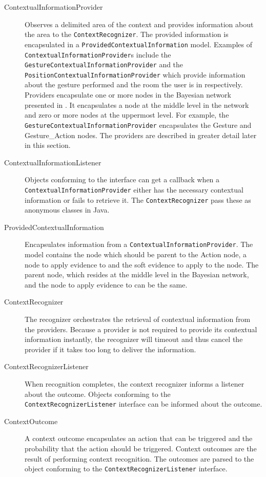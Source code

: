 \begin{description}
\item[ContextualInformationProvider] Observes a delimited area of the context and provides information about the area to the \texttt{ContextRecognizer}. The provided information is encapsulated in a \texttt{ProvidedContextualInformation} model. Examples of \texttt{ContextualInformationProvider}s include the \texttt{GestureContextualInformationProvider} and the \texttt{PositionContextualInformationProvider} which provide information about the gesture performed and the room the user is in respectively. Providers encapsulate one or more nodes in the Bayesian network presented in . It encapsulates a node at the middle level in the network and zero or more nodes at the uppermost level. For example, the \texttt{GestureContextualInformationProvider} encapsulates the Gesture and Gesture\_Action nodes. The providers are described in greater detail later in this section.
\item[ContextualInformationListener] Objects conforming to the interface can get a callback when a \texttt{ContextualInformationProvider} either has the necessary contextual information or fails to retrieve it. The \texttt{ContextRecognizer} pass these as anonymous classes in Java.
\item[ProvidedContextualInformation] Encapsulates information from a \texttt{ContextualInformationProvider}. The model contains the node which should be parent to the Action node, a node to apply evidence to and the soft evidence to apply to the node. The parent node, which resides at the middle level in the Bayesian network, and the node to apply evidence to can be the same.
\item[ContextRecognizer] The recognizer orchestrates the retrieval of contextual information from the providers. Because a provider is not required to provide its contextual information instantly, the recognizer will timeout and thus cancel the provider if it takes too long to deliver the information.
\item[ContextRecognizerListener] When recognition completes, the context recognizer informs a listener about the outcome. Objects conforming to the \texttt{ContextRecognizerListener} interface can be informed about the outcome.
\item[ContextOutcome] A context outcome encapsulates an action that can be triggered and the probability that the action should be triggered. Context outcomes are the result of performing context recognition. The outcomes are parsed to the object conforming to the \texttt{ContextRecognizerListener} interface.
\end{description}

